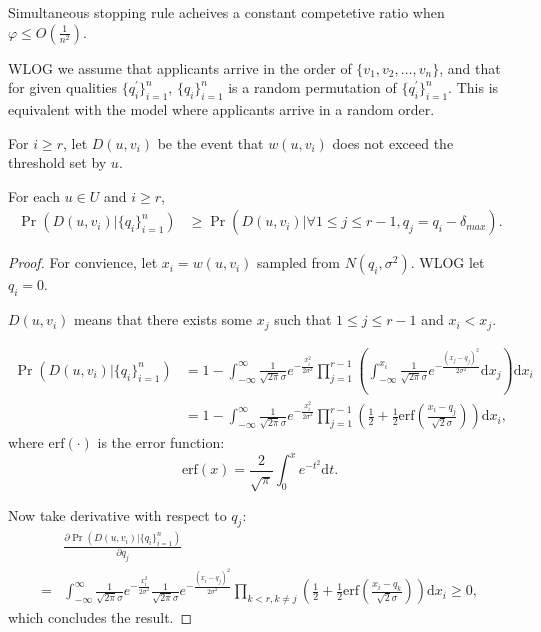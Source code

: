 \begin{theorem}\label{normalthm}
    Simultaneous stopping rule acheives a constant competetive ratio
    when $\varphi \le O(\frac{1}{n^2})$.
\end{theorem}

WLOG we assume that applicants arrive in the order of $\{v_1, v_2, \dots, v_n\}$,
and that for given qualities $\{q_i^\prime\}_{i=1}^n$, $\{q_i\}_{i=1}^n$ is a random permutation of $\{q_i^\prime\}_{i=1}^n$.
This is equivalent with the model where applicants arrive in a random order.

For $i \ge r$, let $D(u, v_i)$ be the event that $w(u, v_i)$
does not exceed the threshold set by $u$.

\begin{proposition} \label{proposition1}
    For each $u \in U$ and $i \ge r$,
    \begin{align*}
    \Pr(D(u, v_i) | \{q_i\}_{i=1}^n) &\ge \Pr(D(u, v_i) | \forall 1 \le j \le r-1, q_j = q_i - \delta_{max}).
    \end{align*}
\end{proposition}

\begin{proof}
    For convience, let $x_i = w(u, v_i)$ sampled from $N(q_i, \sigma^2)$.
    WLOG let $q_i = 0$.

    $D(u, v_i)$ means that there exists some $x_j$ such that $1 \le j \le r-1$ and $x_i < x_j$.

    \begin{align*}
        \Pr(D(u, v_i) | \{q_i\}_{i=1}^n) &= 1 - \int_{-\infty}^{\infty} \frac{1}{\sqrt{2 \pi}\sigma} e^{-\frac{x_i^2}{2\sigma^2}}
    \prod_{j=1}^{r-1}(\int_{-\infty}^{x_i} \frac{1}{\sqrt{2\pi}\sigma} e^{-\frac{(x_j - q_j)^2}{2\sigma^2}}\mathrm{d} x_j) \mathrm{d} x_i \\
    &= 1 - \int_{-\infty}^{\infty} \frac{1}{\sqrt{2 \pi}\sigma} e^{-\frac{x_i^2}{2\sigma^2}}
    \prod_{j=1}^{r-1}(\frac{1}{2} + \frac{1}{2}\mathrm{erf}(\frac{x_i - q_j}{\sqrt{2}\sigma})) \mathrm{d} x_i,
    \end{align*}
    where $\mathrm{erf}(\cdot)$ is the error function:
    \[\mathrm{erf}(x) = \frac{2}{\sqrt{\pi}} \int_{0}^{x} {e^{-t^2}} \mathrm{d} t.\]

    Now take derivative with respect to $q_j$:
    \begin{align*}
        & \frac{\partial\Pr(D(u, v_i) | \{q_i\}_{i=1}^n)}{\partial q_j} \\
        = &\int_{-\infty}^{\infty} \frac{1}{\sqrt{2 \pi}\sigma} e^{-\frac{x_i^2}{2\sigma^2}}
        \frac{1}{\sqrt{2 \pi} \sigma} e^{-\frac{(x_i-q_j)^2}{2\sigma^2}}
        \prod_{k<r,k\neq j}(\frac{1}{2} + \frac{1}{2}\mathrm{erf}(\frac{x_i - q_k}{\sqrt{2}\sigma})) \mathrm{d} x_i
        \ge 0,
    \end{align*}
    which concludes the result.
\end{proof}

